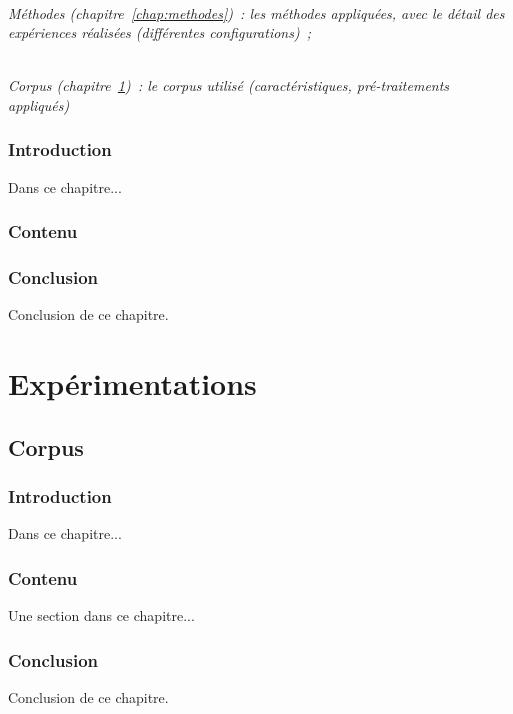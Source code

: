 \documentclass[a4paper,11pt,twoside]{memoir}
\begin{document}
\textit{\\Méthodes (chapitre~\ref{chap:methodes})~: les méthodes
appliquées, avec le détail des expériences réalisées (différentes
configurations)~;}

\textit{\\Corpus (chapitre~\ref{chap:corpus})~: le corpus utilisé
	\emph{(caractéristiques, pré-traitements appliqués)}}

\section{Introduction}
Dans ce chapitre...

%
\newpage

\section{Contenu}

%


\section{Conclusion}
Conclusion de ce chapitre.



\part{Expérimentations}





\chapter{Corpus}
\label{chap:corpus}
\minitoc

\section{Introduction}
Dans ce chapitre...

%

\section{Contenu}
Une section dans ce chapitre...

\section{Conclusion}
Conclusion de ce chapitre.
\end{document}
